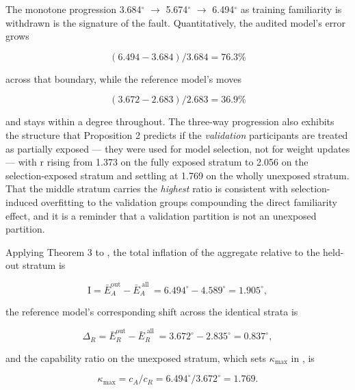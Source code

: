 The monotone progression 3.684$^{\circ}$ $\to$ 5.674$^{\circ}$ $\to$ 6.494$^{\circ}$ as training familiarity is withdrawn is the signature of the fault. Quantitatively, the audited model's error grows

\begin{equation}
\label{eq:169}
( 6.494 - 3.684 ) / 3.684 = 76.3 \%
\end{equation}

across that boundary, while the reference model's moves

\begin{equation}
\label{eq:170}
( 3.672 - 2.683 ) / 2.683 = 36.9 \%
\end{equation}

and stays within a degree throughout. The three-way progression also exhibits the structure that Proposition 2 predicts if the \emph{validation} participants are treated as partially exposed --- they were used for model selection, not for weight updates --- with r rising from 1.373 on the fully exposed stratum to 2.056 on the selection-exposed stratum and settling at 1.769 on the wholly unexposed stratum. That the middle stratum carries the \emph{highest} ratio is consistent with selection-induced overfitting to the validation groups compounding the direct familiarity effect, and it is a reminder that a validation partition is not an unexposed partition.

Applying Theorem 3 to , the total inflation of the aggregate relative to the held-out stratum is

\begin{equation}
\label{eq:171}
\mathrm{I} = \bar{E}_A^{\mathrm{out}} - \bar{E}_A^{\;\text{all}\;} = 6.494^{\circ} - 4.589^{\circ} = 1.905^{\circ} ,
\end{equation}

the reference model's corresponding shift across the identical strata is

\begin{equation}
\label{eq:172}
\Delta _R = \bar{E}_R^{\mathrm{out}} - \bar{E}_R^{\;\text{all}\;} = 3.672^{\circ} - 2.835^{\circ} = 0.837^{\circ} ,
\end{equation}

and the capability ratio on the unexposed stratum, which sets $\kappa_{\mathrm{max}}$ in , is

\begin{equation}
\label{eq:173}
\kappa _{\mathrm{max}} = c_A/c_R = 6.494^{\circ} / 3.672^{\circ} = 1.769 .
\end{equation}

